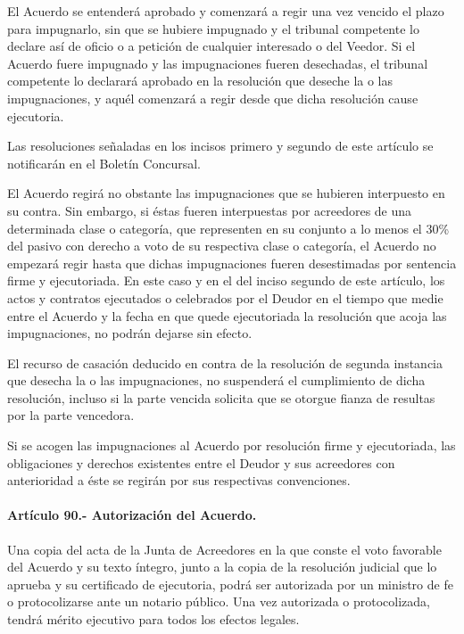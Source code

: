 \documentclass[
]{book}
\begin{document}
El Acuerdo se entenderá aprobado y comenzará a regir una vez vencido el plazo para impugnarlo, sin que se hubiere impugnado y el tribunal competente lo declare así de oficio o a petición de cualquier interesado o del Veedor.
Si el Acuerdo fuere impugnado y las impugnaciones fueren desechadas, el tribunal competente lo declarará aprobado en la resolución que deseche la o las impugnaciones, y aquél comenzará a regir desde que dicha resolución cause ejecutoria.

Las resoluciones señaladas en los incisos primero y segundo de este artículo se notificarán en el Boletín Concursal.

El Acuerdo regirá no obstante las impugnaciones que se hubieren interpuesto en su contra. Sin embargo, si éstas fueren interpuestas por acreedores de una determinada clase o categoría, que representen en su conjunto a lo menos el 30\% del pasivo con derecho a voto de su respectiva clase o categoría, el Acuerdo no empezará regir hasta que dichas impugnaciones fueren desestimadas por sentencia firme y ejecutoriada. En este caso y en el del inciso segundo de este artículo, los actos y contratos ejecutados o celebrados por el Deudor en el tiempo que medie entre el Acuerdo y la fecha en que quede ejecutoriada la resolución que acoja las impugnaciones, no podrán dejarse sin efecto.

El recurso de casación deducido en contra de la resolución de segunda instancia que desecha la o las impugnaciones, no suspenderá el cumplimiento de dicha resolución, incluso si la parte vencida solicita que se otorgue fianza de resultas por la parte vencedora.

Si se acogen las impugnaciones al Acuerdo por resolución firme y ejecutoriada, las obligaciones y derechos existentes entre el Deudor y sus acreedores con anterioridad a éste se regirán por sus respectivas convenciones.

\hypertarget{artuxedculo-90.--autorizaciuxf3n-del-acuerdo.}{%
\paragraph*{Artículo 90.- Autorización del Acuerdo.}\label{artuxedculo-90.--autorizaciuxf3n-del-acuerdo.}}

Una copia del acta de la Junta de Acreedores en la que conste el voto favorable del Acuerdo y su texto íntegro, junto a la copia de la resolución judicial que lo aprueba y su certificado de ejecutoria, podrá ser autorizada por un ministro de fe o protocolizarse ante un notario público. Una vez autorizada o protocolizada, tendrá mérito ejecutivo para todos los efectos legales.
\end{document}
